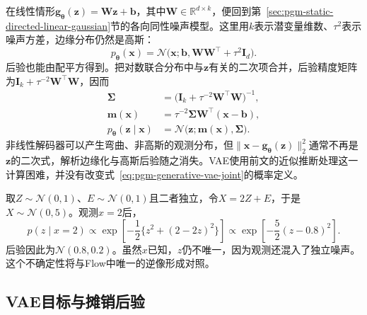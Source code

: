 在线性情形$\bm{g}_{\bm{\theta}}(\bm{z})=\bm{W}\bm{z}+\bm{b}$，其中$\bm{W}\in\mathbb{R}^{d\times k}$，便回到第~\ref{sec:pgm-static-directed-linear-gaussian}节的各向同性噪声模型。这里用$k$表示潜变量维数、$\tau^2$表示噪声方差，边缘分布仍然是高斯：
\[
  p_{\bm{\theta}}(\bm{x})
  =\mathcal{N}\bigl(\bm{x};
    \bm{b},\bm{W}\bm{W}^{\top}+\tau^2\bm{I}_d\bigr).
\]
后验也能由配平方得到。把对数联合分布中与$\bm{z}$有关的二次项合并，后验精度矩阵为$\bm{I}_k+\tau^{-2}\bm{W}^{\top}\bm{W}$，因而
\begin{equation}
  \label{eq:pgm-generative-linear-posterior}
  \begin{aligned}
    \bm{\Sigma}
      &=\bigl(\bm{I}_k+\tau^{-2}\bm{W}^{\top}\bm{W}\bigr)^{-1},\\
    \bm{m}(\bm{x})
      &=\tau^{-2}\bm{\Sigma}\bm{W}^{\top}(\bm{x}-\bm{b}),\\
    p_{\bm{\theta}}(\bm{z}\mid\bm{x})
      &=\mathcal{N}\bigl(\bm{z};\bm{m}(\bm{x}),\bm{\Sigma}\bigr).
  \end{aligned}
\end{equation}
非线性解码器可以产生弯曲、非高斯的观测分布，但$\lVert\bm{x}-\bm{g}_{\bm{\theta}}(\bm{z})\rVert_2^2$通常不再是$\bm{z}$的二次式，解析边缘化与高斯后验随之消失。VAE使用前文的近似推断处理这一计算困难，并没有改变式~\eqref{eq:pgm-generative-vae-joint}的概率定义。

\begin{example}[同一观测分布的潜变量解释]
  \label{ex:pgm-generative-gaussian-latent}
  取$Z\sim\mathcal{N}(0,1)$、$E\sim\mathcal{N}(0,1)$且二者独立，令$X=2Z+E$，于是$X\sim\mathcal{N}(0,5)$。观测$x=2$后，
  \[
    p(z\mid x=2)\propto
    \exp\left[-\frac{1}{2}\{z^2+(2-2z)^2\}\right]
    \propto\exp\left[-\frac{5}{2}(z-0.8)^2\right].
  \]
  后验因此为$\mathcal{N}(0.8,0.2)$。虽然$x$已知，$z$仍不唯一，因为观测还混入了独立噪声。这个不确定性将与Flow中唯一的逆像形成对照。
\end{example}

\subsection{VAE目标与摊销后验}
\label{sec:pgm-generative-vae-objective}

